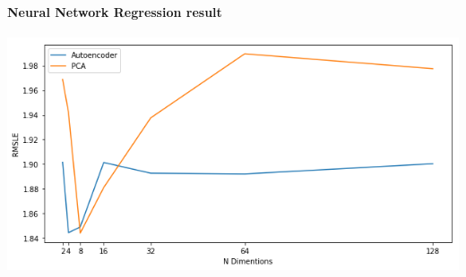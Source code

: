 \documentclass[11pt]{article}
\makeatletter
\def\maxwidth{\ifdim\Gin@nat@width>\linewidth\linewidth
    \else\Gin@nat@width\fi}
\let\Oldincludegraphics\includegraphics
\renewcommand{\includegraphics}[1]{\Oldincludegraphics[width=.8\maxwidth]{#1}}
\makeatother
\begin{document}
    \hypertarget{neural-network-regression-result}{%
\paragraph{Neural Network Regression
result}\label{neural-network-regression-result}}

\includegraphics{images/nn.png}


    
    
    
    
\end{document}
